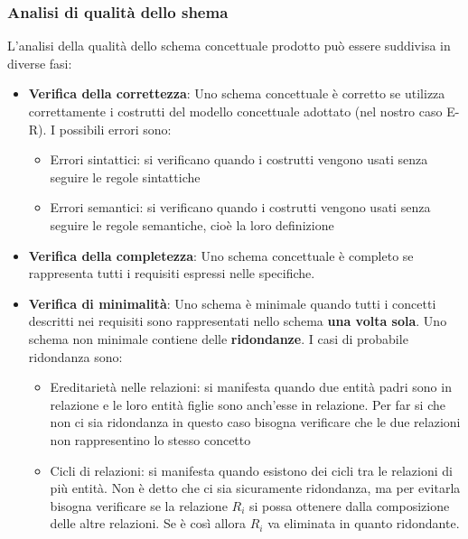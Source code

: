 \documentclass[a4paper]{article}
\begin{document}
\subsubsection{Analisi di qualità dello shema}
L'analisi della qualità dello schema concettuale prodotto può essere suddivisa in diverse
fasi:
\begin{itemize}
  \item \textbf{Verifica della correttezza}: Uno schema concettuale è corretto se utilizza
    correttamente i costrutti del modello concettuale adottato (nel nostro caso E-R).
    I possibili errori sono:
    \begin{itemize}
      \item Errori sintattici: si verificano quando i costrutti vengono usati senza seguire
        le regole sintattiche
      \item Errori semantici: si verificano quando i costrutti vengono usati senza seguire
        le regole semantiche, cioè la loro definizione
    \end{itemize}

  \item \textbf{Verifica della completezza}: Uno schema concettuale è completo se
    rappresenta tutti i requisiti espressi nelle specifiche.

  \item \textbf{Verifica di minimalità}: Uno schema è minimale quando tutti i concetti
    descritti nei requisiti sono rappresentati nello schema \textbf{una volta sola}.
    Uno schema non minimale contiene delle \textbf{ridondanze}. I casi di probabile
    ridondanza sono:
    \begin{itemize}
      \item Ereditarietà nelle relazioni: si manifesta quando due 
        entità padri sono in relazione e le loro entità figlie sono anch'esse in relazione.
        Per far si che non ci sia ridondanza in questo caso bisogna verificare che le 
        due relazioni non rappresentino lo stesso concetto

      \item Cicli di relazioni: si manifesta quando esistono dei cicli tra le relazioni
        di più entità. Non è detto che ci sia sicuramente ridondanza, ma per evitarla
        bisogna verificare se la relazione \( R_i \) si possa ottenere dalla composizione
        delle altre relazioni. Se è così allora \( R_i \) va eliminata in quanto ridondante.
    \end{itemize}


\end{itemize}
\end{document}
